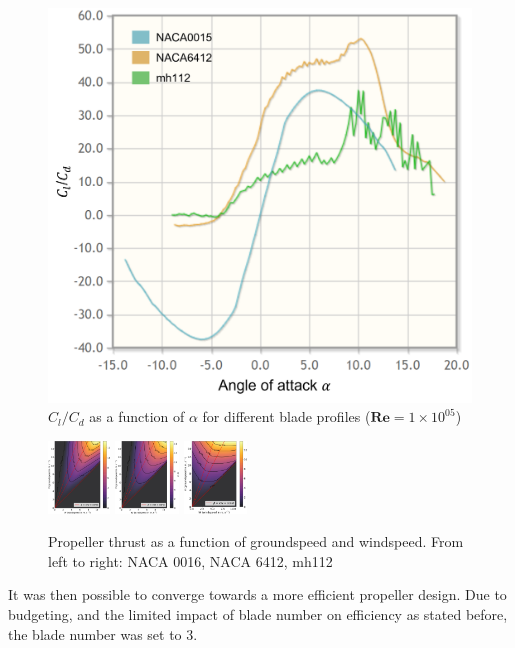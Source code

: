 \begin{figure}[!htbp]
    \centering
    \includegraphics[width = 0.5\linewidth]{images/part6/clcdalpha.png}
    \caption{$C_l/C_d$ as a function of $\alpha$ for different blade profiles ($\mathbf{Re} = 1\times10^{05}$)}
    \label{fig:clcdalpha}
\end{figure}

\begin{figure}[!htbp]
    \centering
    \includegraphics[width =0.1465\textwidth]{images/part6/naca0016.pdf}
    \includegraphics[width =0.152\textwidth]{images/part6/naca6412.pdf}
    \includegraphics[width =0.15\textwidth]{images/part6/mh112.pdf}
    \caption{Propeller thrust as a function of groundspeed and windspeed. From left to right: NACA 0016, NACA 6412, mh112}

    \label{fig:aeroprofiles}
\end{figure}

It was then possible to converge towards a more efficient propeller design. Due to budgeting, and the limited impact of blade number on efficiency as stated before, the blade number was set to 3.

